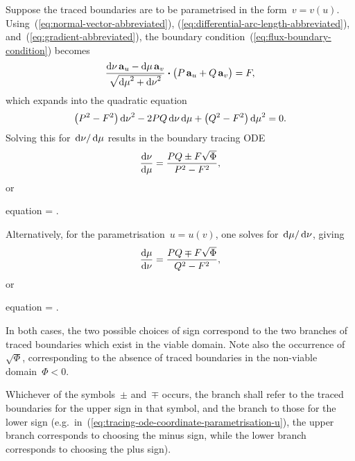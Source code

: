 Suppose the traced boundaries are to be parametrised
in the form~$v = v (u)$.
Using~(\ref{eq:normal-vector-abbreviated}),
(\ref{eq:differential-arc-length-abbreviated}),
and~(\ref{eq:gradient-abbreviated}),
the boundary condition~(\ref{eq:flux-boundary-condition}) becomes
\[
  \frac{
    \td \nu \basisvec{u} - \td \mu \basisvec{v}
  }{
    \sqrt{{\td \mu}^2 + {\td \nu}^2}
  }
    \dotp
  \roundbr[\big]{P \basisvec{u} + Q \basisvec{v}}
    =
  F,
\]
which expands into the quadratic equation
\begin{equation}
  \roundbr*{P^2 - F^2} \, {\td \nu}^2
  - 2 P Q \td \nu \td \mu
  + \roundbr*{Q^2 - F^2} \, {\td \mu}^2
    =
  0.
  \label{eq:tracing-coordinate-parametrisation-quadratic}
\end{equation}
Solving this for~$\mathop{}\!\mathrm{d} \nu / \mathop{}\!\mathrm{d} \mu$ results in the boundary tracing ODE
\begin{equation}
  \tder{\nu}{\mu} = \frac{P Q \pm F \sqrt{\Phi}}{P^2 - F^2},
  \label{eq:tracing-ode-coordinate-parametrisation-nu}
\end{equation}
or
\begin{important}{equation}
   =
    \frac{\scalefac[u]}{\scalefac[v]}
      \cdot
    .
  \label{eq:tracing-ode-coordinate-parametrisation-v}
\end{important}
Alternatively, for the parametrisation~$u = u (v)$,
one solves for~$\mathop{}\!\mathrm{d} \mu / \mathop{}\!\mathrm{d} \nu$, giving
\begin{equation}
  \tder{\mu}{\nu} = \frac{P Q \mp F \sqrt{\Phi}}{Q^2 - F^2},
  \label{eq:tracing-ode-coordinate-parametrisation-mu}
\end{equation}
or
\begin{important}{equation}
   =
    \frac{\scalefac[v]}{\scalefac[u]}
      \cdot
    .
  \label{eq:tracing-ode-coordinate-parametrisation-u}
\end{important}
In both cases, the two possible choices of sign
correspond to the two branches of traced boundaries
which exist in the viable domain.
Note also the occurrence of~$\sqrt{\Phi}$,
corresponding to the absence of traced boundaries
in the non-viable domain~$\Phi < 0$.

Whichever of the symbols~$\pm$ and~$\mp$ occurs,
the  branch shall refer to
the traced boundaries for the upper sign in that symbol,
and the  branch to those for the lower sign
(e.g.~in~(\ref{eq:tracing-ode-coordinate-parametrisation-u}),
the upper branch corresponds to choosing the minus sign,
while the lower branch corresponds to choosing the plus sign).

